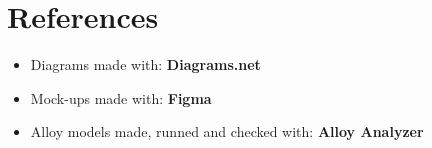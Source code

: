 \documentclass{article}
\begin{document}
\newpage

\section{References}

\begin{itemize}
    \item Diagrams made with: \textbf{Diagrams.net}
    \item Mock-ups made with: \textbf{Figma}
    \item Alloy models made, runned and checked with: \textbf{Alloy Analyzer}
\end{itemize}
\end{document}
